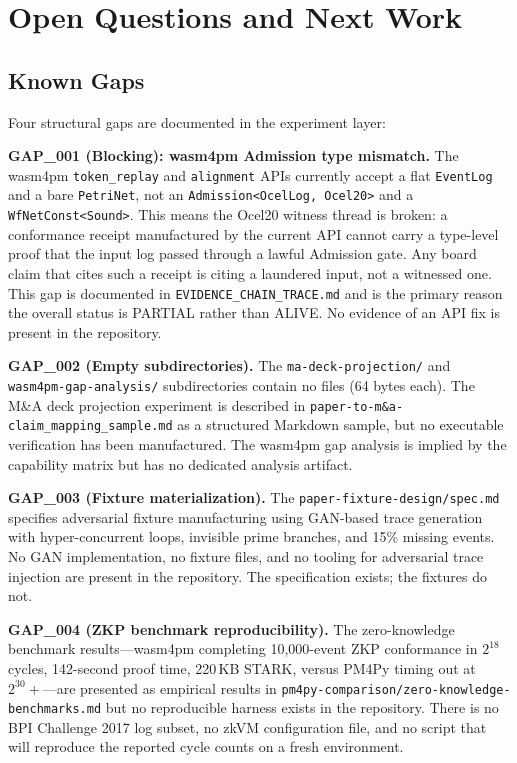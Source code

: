 
\section{Open Questions and Next Work}
\label{sec:experiments-core-open}

\subsection{Known Gaps}
\label{sec:experiments-core-open-gaps}

Four structural gaps are documented in the experiment layer:

\textbf{GAP\_001 (Blocking): wasm4pm Admission type mismatch.} The wasm4pm
\texttt{token\_replay} and \texttt{alignment} APIs currently accept a flat
\texttt{EventLog} and a bare \texttt{PetriNet}, not an \texttt{Admission<OcelLog, Ocel20>}
and a \texttt{WfNetConst<Sound>}. This means the Ocel20 witness thread is broken:
a conformance receipt manufactured by the current API cannot carry a type-level
proof that the input log passed through a lawful Admission gate. Any board claim
that cites such a receipt is citing a laundered input, not a witnessed one. This
gap is documented in \texttt{EVIDENCE\_CHAIN\_TRACE.md} and is the primary reason
the overall status is PARTIAL rather than ALIVE. No evidence of an API fix is
present in the repository.

\textbf{GAP\_002 (Empty subdirectories).} The \texttt{ma-deck-projection/} and
\texttt{wasm4pm-gap-analysis/} subdirectories contain no files (64 bytes each).
The M\&A deck projection experiment is described in \texttt{paper-to-m\&a-claim\_mapping\_sample.md}
as a structured Markdown sample, but no executable verification has been manufactured.
The wasm4pm gap analysis is implied by the capability matrix but has no dedicated
analysis artifact.

\textbf{GAP\_003 (Fixture materialization).} The \texttt{paper-fixture-design/spec.md}
specifies adversarial fixture manufacturing using GAN-based trace generation with
hyper-concurrent loops, invisible prime branches, and 15\% missing events. No GAN
implementation, no fixture files, and no tooling for adversarial trace injection
are present in the repository. The specification exists; the fixtures do not.

\textbf{GAP\_004 (ZKP benchmark reproducibility).} The zero-knowledge benchmark
results---wasm4pm completing 10,000-event ZKP conformance in $2^{18}$ cycles,
142-second proof time, 220\,KB STARK, versus PM4Py timing out at $2^{30}+$---are
presented as empirical results in \texttt{pm4py-comparison/zero-knowledge-benchmarks.md}
but no reproducible harness exists in the repository. There is no BPI Challenge 2017
log subset, no zkVM configuration file, and no script that will reproduce the
reported cycle counts on a fresh environment.

